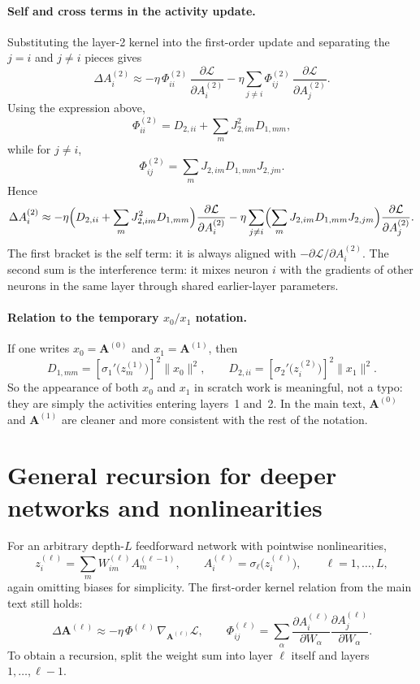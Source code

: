 \documentclass[10pt]{article}
\newcommand{\vA}{\mathbf{A}}
\newcommand{\loss}{\mathcal{L}}
\begin{document}
\paragraph{Self and cross terms in the activity update.}
Substituting the layer-2 kernel into the first-order update and separating the $j=i$ and $j\neq i$ pieces gives
\[
  \Delta A_i^{(2)}
  \approx
  -\eta \,\Phi_{ii}^{(2)}\,\frac{\partial \loss}{\partial A_i^{(2)}}
  -
  \eta \sum_{j\neq i} \Phi_{ij}^{(2)}\,\frac{\partial \loss}{\partial A_j^{(2)}}.
\]
Using the expression above,
\[
  \Phi_{ii}^{(2)}
  =
  D_{2,ii}
  +
  \sum_m J_{2,im}^2 D_{1,mm},
\]
while for $j\neq i$,
\[
  \Phi_{ij}^{(2)}
  =
  \sum_m J_{2,im} D_{1,mm} J_{2,jm}.
\]
Hence
\[
  \Delta A_i^{(2)}
  \approx
  -\eta \Bigl(D_{2,ii} + \sum_m J_{2,im}^2 D_{1,mm}\Bigr) \frac{\partial \loss}{\partial A_i^{(2)}}
  -
  \eta \sum_{j\neq i}
  \Bigl(\sum_m J_{2,im} D_{1,mm} J_{2,jm}\Bigr)
  \frac{\partial \loss}{\partial A_j^{(2)}}.
\]
The first bracket is the self term: it is always aligned with $-\partial \loss/\partial A_i^{(2)}$.  The second sum is the interference term: it mixes neuron $i$ with the gradients of other neurons in the same layer through shared earlier-layer parameters.

\paragraph{Relation to the temporary $x_0/x_1$ notation.}
If one writes $x_0 = \vA^{(0)}$ and $x_1 = \vA^{(1)}$, then
\[
  D_{1,mm} = [\sigma_1'\!\bigl(z_m^{(1)}\bigr)]^2 \lVert x_0 \rVert^2,
  \qquad
  D_{2,ii} = [\sigma_2'\!\bigl(z_i^{(2)}\bigr)]^2 \lVert x_1 \rVert^2.
\]
So the appearance of both $x_0$ and $x_1$ in scratch work is meaningful, not a typo: they are simply the activities entering layers~1 and~2.  In the main text, $\vA^{(0)}$ and $\vA^{(1)}$ are cleaner and more consistent with the rest of the notation.

\section{General recursion for deeper networks and nonlinearities}

For an arbitrary depth-$L$ feedforward network with pointwise nonlinearities,
\[
  z_i^{(\ell)} = \sum_m W_{im}^{(\ell)} A_m^{(\ell-1)},
  \qquad
  A_i^{(\ell)} = \sigma_\ell\!\bigl(z_i^{(\ell)}\bigr),
  \qquad \ell = 1,\dots,L,
\]
again omitting biases for simplicity.  The first-order kernel relation from the main text still holds:
\[
  \Delta \vA^{(\ell)} \approx -\eta\,\Phi^{(\ell)}\,\nabla_{\!\vA^{(\ell)}} \loss,
  \qquad
  \Phi_{ij}^{(\ell)} = \sum_\alpha
  \frac{\partial A_i^{(\ell)}}{\partial W_\alpha}
  \frac{\partial A_j^{(\ell)}}{\partial W_\alpha}.
\]
To obtain a recursion, split the weight sum into layer $\ell$ itself and layers $1,\dots,\ell-1$.
\end{document}
